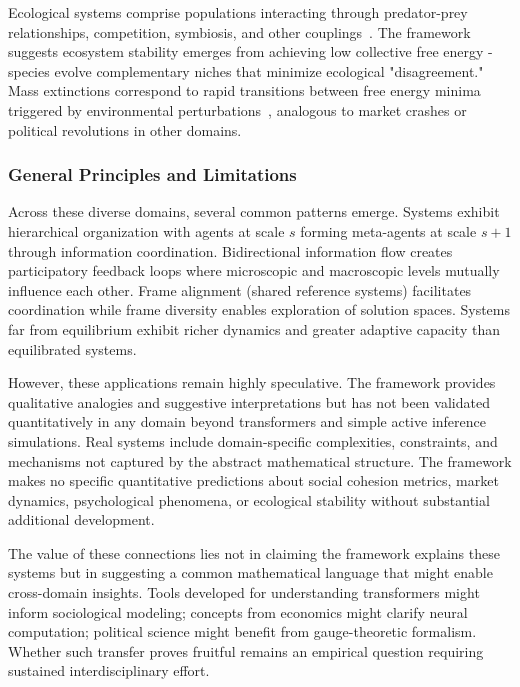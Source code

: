 \documentclass[11pt]{article}
\begin{document}
Ecological systems comprise populations interacting through predator-prey relationships, competition, symbiosis, and other couplings~\cite{May1973,Levin1998}. The framework suggests ecosystem stability emerges from achieving low collective free energy - species evolve complementary niches that minimize ecological "disagreement." Mass extinctions correspond to rapid transitions between free energy minima triggered by environmental perturbations~\cite{Scheffer2001}, analogous to market crashes or political revolutions in other domains.

\subsubsection{General Principles and Limitations}

Across these diverse domains, several common patterns emerge. Systems exhibit hierarchical organization with agents at scale $s$ forming meta-agents at scale $s+1$ through information coordination. Bidirectional information flow creates participatory feedback loops where microscopic and macroscopic levels mutually influence each other. Frame alignment (shared reference systems) facilitates coordination while frame diversity enables exploration of solution spaces. Systems far from equilibrium exhibit richer dynamics and greater adaptive capacity than equilibrated systems.

However, these applications remain highly speculative. The framework provides qualitative analogies and suggestive interpretations but has not been validated quantitatively in any domain beyond transformers and simple active inference simulations. Real systems include domain-specific complexities, constraints, and mechanisms not captured by the abstract mathematical structure. The framework makes no specific quantitative predictions about social cohesion metrics, market dynamics, psychological phenomena, or ecological stability without substantial additional development.

The value of these connections lies not in claiming the framework explains these systems but in suggesting a common mathematical language that might enable cross-domain insights. Tools developed for understanding transformers might inform sociological modeling; concepts from economics might clarify neural computation; political science might benefit from gauge-theoretic formalism. Whether such transfer proves fruitful remains an empirical question requiring sustained interdisciplinary effort.
\end{document}
